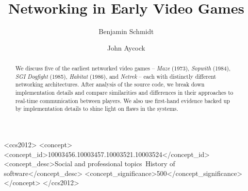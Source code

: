 \documentclass[sigconf, balance=false]{acmart}
\begin{document}
\title{Networking in Early Video Games}

\author{Benjamin Schmidt}

\author{John Aycock}


\begin{CCSXML}
  <ccs2012>
  <concept>
  <concept_id>10003456.10003457.10003521.10003524</concept_id>
  <concept_desc>Social and professional topics~History of software</concept_desc>
  <concept_significance>500</concept_significance>
  </concept>
  </ccs2012>
\end{CCSXML}


\begin{abstract}
  We discuss five of the earliest networked video games -- \textit{Maze} (1973), \textit{Sopwith} (1984), \textit{SGI Dogfight} (1985), \textit{Habitat} (1986), and \textit{Netrek} -- each with distinctly different networking architectures. After analysis of the source code, we break down implementation details and compare similarities and differences in their approaches to real-time communication between players. We also use first-hand evidence backed up by implementation details to shine light on flaws in the systems.
\end{abstract}

\maketitle









\end{document}
